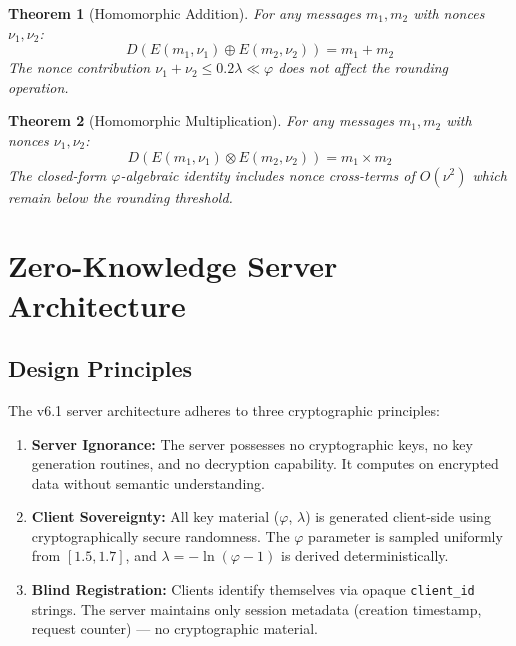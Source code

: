 \documentclass{article}
\newtheorem{theorem}{Theorem}[section]
\begin{document}
\begin{theorem}[Homomorphic Addition]
For any messages $m_1, m_2$ with nonces $\nu_1, \nu_2$:
\begin{equation}
D(E(m_1, \nu_1) \oplus E(m_2, \nu_2)) = m_1 + m_2
\end{equation}
The nonce contribution $\nu_1 + \nu_2 \leq 0.2\lambda \ll \varphi$ does not affect the rounding operation.
\end{theorem}

\begin{theorem}[Homomorphic Multiplication]
For any messages $m_1, m_2$ with nonces $\nu_1, \nu_2$:
\begin{equation}
D(E(m_1, \nu_1) \otimes E(m_2, \nu_2)) = m_1 \times m_2
\end{equation}
The closed-form $\varphi$-algebraic identity includes nonce cross-terms of $O(\nu^2)$ which remain below the rounding threshold.
\end{theorem}

\section{Zero-Knowledge Server Architecture}

\subsection{Design Principles}

The v6.1 server architecture adheres to three cryptographic principles:

\begin{enumerate}
    \item \textbf{Server Ignorance:} The server possesses no cryptographic keys, no key generation routines, and no decryption capability. It computes on encrypted data without semantic understanding.
    
    \item \textbf{Client Sovereignty:} All key material ($\varphi$, $\lambda$) is generated client-side using cryptographically secure randomness. The $\varphi$ parameter is sampled uniformly from $[1.5, 1.7]$, and $\lambda = -\ln(\varphi - 1)$ is derived deterministically.
    
    \item \textbf{Blind Registration:} Clients identify themselves via opaque \texttt{client\_id} strings. The server maintains only session metadata (creation timestamp, request counter) — no cryptographic material.
\end{enumerate}
\end{document}
